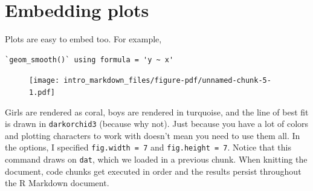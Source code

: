 \documentclass[
  letterpaper,
  DIV=11,
  numbers=noendperiod]{scrreprt}
\newenvironment{Shaded}{\begin{snugshade}}{\end{snugshade}}
\newcommand{\AttributeTok}[1]{\textcolor[rgb]{0.49,0.56,0.16}{#1}}
\newcommand{\ConstantTok}[1]{\textcolor[rgb]{0.53,0.00,0.00}{#1}}
\newcommand{\DecValTok}[1]{\textcolor[rgb]{0.25,0.63,0.44}{#1}}
\newcommand{\FunctionTok}[1]{\textcolor[rgb]{0.02,0.16,0.49}{#1}}
\newcommand{\NormalTok}[1]{\textcolor[rgb]{0.00,0.44,0.13}{#1}}
\newcommand{\OtherTok}[1]{\textcolor[rgb]{0.00,0.44,0.13}{#1}}
\newcommand{\SpecialCharTok}[1]{\textcolor[rgb]{0.25,0.44,0.63}{#1}}
\newcommand{\StringTok}[1]{\textcolor[rgb]{0.25,0.44,0.63}{#1}}
\begin{document}
\hypertarget{embedding-plots}{%
\section{Embedding plots}\label{embedding-plots}}

Plots are easy to embed too. For example,

\begin{Shaded}
\end{Shaded}

\begin{verbatim}
`geom_smooth()` using formula = 'y ~ x'
\end{verbatim}

\begin{figure}[H]

{\centering \texttt{[image: intro\_markdown\_files/figure-pdf/unnamed-chunk-5-1.pdf]}

}

\end{figure}

Girls are rendered as coral, boys are rendered in turquoise, and the
line of best fit is drawn in \texttt{darkorchid3} (because why not).
Just because you have a lot of colors and plotting characters to work
with doesn't mean you need to use them all. In the options, I specified
\texttt{fig.width\ =\ 7} and \texttt{fig.height\ =\ 7}. Notice that this
command draws on \texttt{dat}, which we loaded in a previous chunk. When
knitting the document, code chunks get executed in order and the results
persist throughout the R Markdown document.
\end{document}
